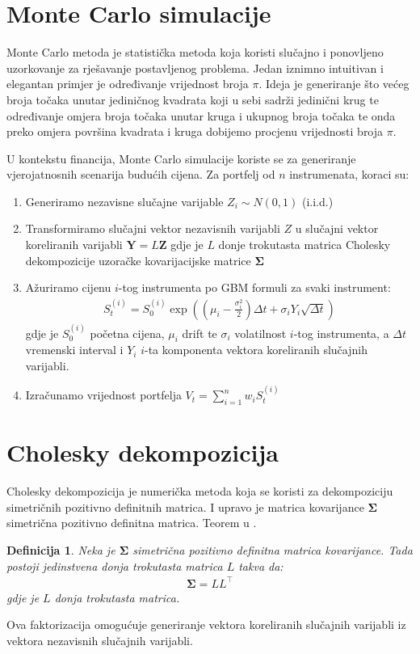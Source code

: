 \documentclass[zavrsnirad, upload]{fer}
\newtheorem{definition}{Definicija}
\begin{document}
\section{Monte Carlo simulacije}
\label{sek:monte_carlo}
Monte Carlo metoda je statistička metoda koja koristi slučajno i ponovljeno
uzorkovanje za rješavanje postavljenog problema.
Jedan iznimno intuitivan i elegantan primjer je određivanje
vrijednost broja $\pi$.
Ideja je generiranje što većeg broja točaka unutar jediničnog
kvadrata koji u sebi sadrži jedinični krug te određivanje
omjera broja točaka unutar kruga i ukupnog broja točaka te onda
preko omjera površina kvadrata i kruga dobijemo procjenu vrijednosti
broja $\pi$.

U kontekstu financija, Monte Carlo simulacije koriste se za
generiranje vjerojatnosnih scenarija budućih cijena.
Za portfelj od $n$ instrumenata, koraci su:
\begin{enumerate}
    \item Generiramo nezavisne slučajne varijable $Z_i \sim N(0,1)$ (i.i.d.)
\item Transformiramo slučajni vektor nezavisnih varijabli $Z$ u
    slučajni vektor koreliranih varijabli $\mathbf{Y} = L\mathbf{Z}$
    gdje je $L$ donje trokutasta matrica Cholesky
        dekompozicije uzoračke kovarijacijske matrice $\boldsymbol{\Sigma}$
\item Ažuriramo cijenu $i$-tog instrumenta po GBM formuli za svaki instrument:
\begin{align}
S_t^{(i)} = S_0^{(i)} \exp\left(\left(\mu_i - \frac{\sigma_i^2}{2}\right)\Delta t + \sigma_i Y_i \sqrt{\Delta t}\right)
\end{align}
        \indent gdje je $S_0^{(i)}$ početna cijena, $\mu_i$ drift te $\sigma_i$
        volatilnost $i$-tog instrumenta, a $\Delta t$ vremenski interval
        i $Y_i$ $i$-ta komponenta vektora koreliranih slučajnih varijabli.

\item Izračunamo vrijednost portfelja $V_t = \sum_{i=1}^n w_i S_t^{(i)}$
\end{enumerate}

\section{Cholesky dekompozicija}
\label{sek:cholesky}
Cholesky dekompozicija je numerička metoda koja se koristi za
dekompoziciju simetričnih pozitivno definitnih matrica. I upravo
je matrica kovarijance $\boldsymbol{\Sigma}$ simetrična pozitivno
definitna matrica. Teorem u \cite{NumerickaMatematika}.
\begin{definition}
    \label{def:cholesky}
    Neka je $\boldsymbol{\Sigma}$ simetrična pozitivno definitna
    matrica kovarijance. Tada postoji jedinstvena donja trokutasta
    matrica $L$ takva da:
    \begin{align}
        \boldsymbol{\Sigma} = LL^\intercal
    \end{align}
    \indent gdje je $L$ donja trokutasta matrica.
\end{definition}
Ova faktorizacija omogućuje generiranje vektora koreliranih slučajnih varijabli
iz vektora nezavisnih slučajnih varijabli.
\end{document}
